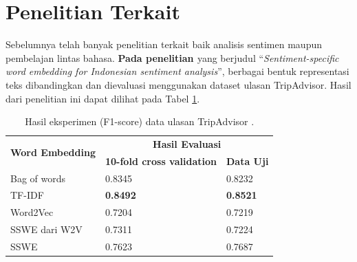 \section{Penelitian Terkait}
Sebelumnya telah banyak penelitian terkait baik analisis sentimen maupun pembelajan lintas bahasa. \textbf{Pada penelitian \parencite{FarhanKhodra2017}} yang berjudul “\textit{Sentiment-specific word embedding for Indonesian sentiment analysis}”, berbagai bentuk representasi teks dibandingkan dan dievaluasi menggunakan dataset ulasan TripAdvisor. Hasil dari penelitian ini dapat dilihat pada Tabel \ref{tab:FarhanKhodra2017}.

\begin{table}[]
    \centering
    \caption{Hasil eksperimen (F1-score) data ulasan TripAdvisor \parencite{FarhanKhodra2017}.}
    \begin{tabular}{|l|l|l|}
    \hline
    \multicolumn{1}{|c|}{\multirow{2}{*}{\textbf{Word Embedding}}} & \multicolumn{2}{c|}{\textbf{Hasil Evaluasi}}                                                    \\ \cline{2-3} 
    \multicolumn{1}{|c|}{}                                         & \multicolumn{1}{c|}{\textbf{10-fold cross validation}} & \multicolumn{1}{c|}{\textbf{Data Uji}} \\ \hline
    Bag of words                                                   & 0.8345                                                 & 0.8232                                 \\ \hline
    TF-IDF                                                         & \textbf{0.8492}                                        & \textbf{0.8521}                        \\ \hline
    Word2Vec                                                       & 0.7204                                                 & 0.7219                                 \\ \hline
    SSWE dari W2V                                                  & 0.7311                                                 & 0.7224                                 \\ \hline
    SSWE                                                           & 0.7623                                                 & 0.7687                                 \\ \hline
    \end{tabular}
    \label{tab:FarhanKhodra2017}
\end{table} 

